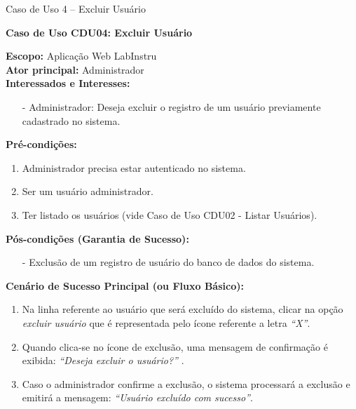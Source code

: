 	\begin{quadro}[h!]\caption{Caso de Uso 4 -- Excluir Usuário}
	\hfill
	\end{quadro}
	\begin{mdframed}

		\textbf{Caso de Uso CDU04: Excluir Usuário}\\

		\begin{flushleft}

		\textbf{Escopo:} Aplicação Web LabInstru\\

		\textbf{Ator principal:} Administrador\\

		\textbf{Interessados e Interesses:}
		\begin{itemize}
			\item[-] Administrador: Deseja excluir o registro de um usuário previamente cadastrado no sistema.
		\end{itemize}

		\textbf{Pré-condições:}\\
			 \begin{enumerate}
			 	\item{Administrador precisa estar autenticado no sistema.}
			 	\item{Ser um usuário administrador.}
			 	\item{Ter listado os usuários (vide Caso de Uso CDU02 - Listar Usuários).}
			 \end{enumerate}

		\textbf{Pós-condições (Garantia de Sucesso):}
		\begin{itemize}
			\item[-] Exclusão de um registro de usuário do banco de dados do sistema.
		\end{itemize}


		\textbf{Cenário de Sucesso Principal (ou Fluxo Básico):}\\
			\begin{enumerate}
				\item{Na linha referente ao usuário que será excluído do sistema, clicar na opção \textit{excluir usuário} que é representada pelo ícone referente a letra \textit{``X''}.}
				\item{Quando clica-se no ícone de exclusão, uma mensagem de confirmação é exibida: \textit{``Deseja excluir o usuário?''} . }
				\item{Caso o administrador confirme a exclusão, o sistema processará a exclusão e emitirá a mensagem: \textit{``Usuário excluído com sucesso''}.}
			 \end{enumerate}


\end{flushleft}
\end{mdframed}
